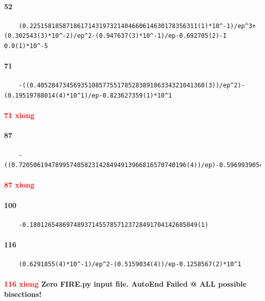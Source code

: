 \documentclass{article}
\newcommand{\WN}[1]{\textcolor{RawSienna}{#1}}
\newcommand{\WNZF}{\WN{Zero FIRE.py input file. }}
\begin{document}
\paragraph{52}
\begin{verbatim}
	(0.2251581858718617143197321404660614630178356311(1)*10^-1)/ep^3+(0.302543(3)*10^-2)/ep^2-(0.947637(3)*10^-1)/ep-0.692705(2)-I 0.0(1)*10^-5
\end{verbatim}
\paragraph{71}
\begin{verbatim}
	-((0.4052847345693510857755178528389106334321041360(3))/ep^2)-(0.19519788014(4)*10^1)/ep-0.823627359(1)*10^1
\end{verbatim}
\paragraph{\textcolor{red}{71 xiong}}

\paragraph{87}
\begin{verbatim}
	-((0.7205061947899574858231428494913966816570740196(4))/ep)-0.5969939054(1)*10^1
\end{verbatim}
\paragraph{\textcolor{red}{87 xiong}}

\paragraph{100}
\begin{verbatim}
	-0.1801265486974893714557857123728491704142685049(1)
\end{verbatim}
\paragraph{116}
\begin{verbatim}
	(0.6291855(4)*10^-1)/ep^2-(0.5159034(4))/ep-0.1258567(2)*10^1
\end{verbatim}
\paragraph{\textcolor{red}{116 xiong}	\WNZF AutoEnd Failed @ ALL possible bisections!}
\end{document}

